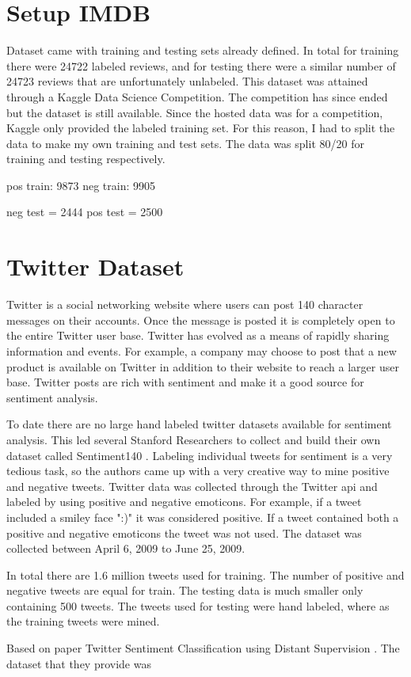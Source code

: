 \documentclass[12pt]{article}
\begin{document}
\section{Setup IMDB}
Dataset came with training and testing sets already defined. In total for training there were 24722 labeled reviews, and for testing there were a similar number of 24723 reviews that are unfortunately unlabeled. This dataset was attained through a Kaggle Data Science Competition. The competition has since ended but the dataset is still available. Since the hosted data was for a competition, Kaggle only provided the labeled training set. For this reason, I had to split the data to make my own training and test sets. The data was split 80\slash20 for training and testing respectively.

pos train: 9873
neg train: 9905

neg test = 2444
pos test = 2500


\section{Twitter Dataset}

Twitter is a social networking website \cite{twitter} where users can post 140 character messages on their accounts. Once the message is posted it is completely open to the entire Twitter user base. Twitter has evolved as a means of rapidly sharing information and events. For example, a company may choose to post that a new product is available on Twitter in addition to their website to reach a larger user base. Twitter posts are rich with sentiment and make it a good source for sentiment analysis.

To date there are no large hand labeled twitter datasets available for sentiment analysis. This led several Stanford Researchers \cite{Go_Bhayani_Huang_2009} to collect and build their own dataset called Sentiment140 \cite{sentiment140}. Labeling individual tweets for sentiment is a very tedious task, so the authors came up with a very creative way to mine positive and negative tweets. Twitter data was collected through the Twitter \ac{api} and labeled by using positive and negative emoticons. For example, if a tweet included a smiley face ":)" it was considered positive. If a tweet contained both a positive and negative emoticons the tweet was not used. The dataset was collected between April 6, 2009 to June 25, 2009.

In total there are 1.6 million tweets used for training. The number of positive and negative tweets are equal for train. The testing data is much smaller only containing 500 tweets. The tweets used for testing were hand labeled, where as the training tweets were mined.



Based on paper Twitter Sentiment Classification using Distant Supervision \cite{Go_Bhayani_Huang_2009}. The dataset that they provide was

\newpage


\end{document}
